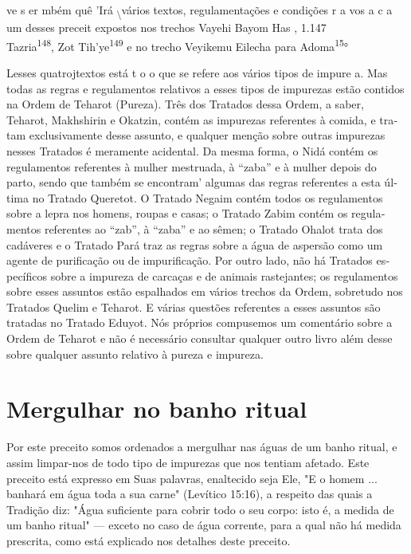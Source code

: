 ve s er mbém quê 'Irá \textsubscript{\textbackslash{}}vários textos,
regulamentações e condições r a vos a c a um desses preceit expostos nos
trechos Vayehi Bayom Has , 1.147\\
Tazria\textsuperscript{148}, Zot Tih'ye\textsuperscript{149} e no trecho
Veyikemu Eilecha para Adoma\textsuperscript{15}°

Les­ses quatrojtextos está t o o que se refere aos vários tipos de
impure a. Mas todas as regras e regulamentos relativos a esses tipos de
impurezas estão conti­dos na Ordem de Teharot (Pureza). Três dos
Tratados dessa Ordem, a saber, Teharot, Makhshirin e Okatzin, contém as
impurezas referentes à comida, e tra­tam exclusivamente desse assunto, e
qualquer menção sobre outras impurezas nesses Tratados é meramente
acidental. Da mesma forma, o Nidá contém os regulamentos referentes à
mulher mestruada, à ``zaba'' e à mulher depois do parto, sendo que também
se encontram' algumas das regras referentes a esta úl­tima no Tratado
Queretot. O Tratado Negaim contém todos os regulamentos sobre a lepra
nos homens, roupas e casas; o Tratado Zabim contém os regula­mentos
referentes ao ``zab'', à ``zaba'' e ao sêmen; o Tratado Ohalot trata dos
cadáveres e o Tratado Pará traz as regras sobre a água de aspersão como
um agente de purificação ou de impurificação. Por outro lado, não há
Tratados es­pecíficos sobre a impureza de carcaças e de animais
rastejantes; os regulamen­tos sobre esses assuntos estão espalhados em
vários trechos da Ordem, sobre­tudo nos Tratados Quelim e Teharot. E
várias questões referentes a esses as­suntos são tratadas no Tratado
Eduyot. Nós próprios compusemos um comen­tário sobre a Ordem de Teharot
e não é necessário consultar qualquer outro livro além desse sobre
qualquer assunto relativo à pureza e impureza.

\section{Mergulhar no banho ritual}

Por este preceito somos ordenados a mergulhar nas águas de um ba­nho
ritual, e assim limpar-nos de todo tipo de impurezas que nos tentiam
afeta­do. Este preceito está expresso em Suas palavras, enaltecido seja
Ele, "E o ho­mem ... banhará em água toda a sua carne" (Levítico 15:16),
a respeito das quais a Tradição diz: "Água suficiente para cobrir todo o
seu corpo: isto é, a medida de um banho ritual" --- exceto no caso de
água corrente, para a qual não há medida prescrita, como está explicado
nos detalhes deste preceito.

